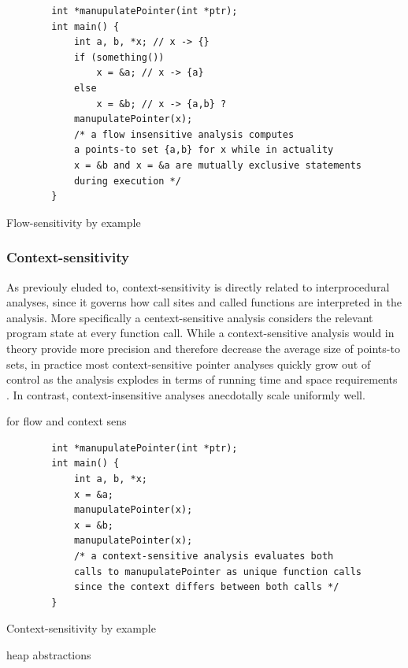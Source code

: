 \begin{listing}
    \begin{verbatim}
        int *manupulatePointer(int *ptr);
        int main() {
            int a, b, *x; // x -> {}
            if (something())
                x = &a; // x -> {a}
            else
                x = &b; // x -> {a,b} ?
            manupulatePointer(x);
            /* a flow insensitive analysis computes 
            a points-to set {a,b} for x while in actuality 
            x = &b and x = &a are mutually exclusive statements
            during execution */
        }
    \end{verbatim}
    \caption{Flow-sensitivity by example}
    \label{lst:flowsens}
\end{listing}

\subsubsection{Context-sensitivity}
As previouly eluded to, context-sensitivity is directly related to interprocedural analyses, since it governs how call sites and called functions are interpreted in the analysis.
More specifically a centext-sensitive analysis considers the relevant program state at every function call.
While a context-sensitive analysis would in theory provide more precision and therefore decrease the average size of points-to sets, in practice most context-sensitive pointer analyses quickly grow out of control as the analysis explodes in terms of running time and space requirements \cite{smaragdakis2014introspective}. In contrast, context-insensitive analyses anecdotally scale uniformly well.

\cite{smaragdakis2015pointer} for flow and context sens

\begin{listing}
    \begin{verbatim}
        int *manupulatePointer(int *ptr);
        int main() {
            int a, b, *x;
            x = &a;
            manupulatePointer(x);
            x = &b;
            manupulatePointer(x);
            /* a context-sensitive analysis evaluates both
            calls to manupulatePointer as unique function calls
            since the context differs between both calls */
        }
    \end{verbatim}
    \caption{Context-sensitivity by example}
    \label{lst:contextsens}
\end{listing}

heap abstractions \cite{kanvar2016heap}

